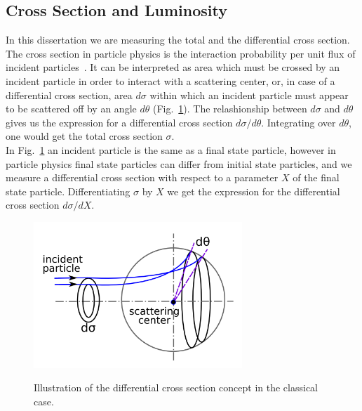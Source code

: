 \subsection{Cross Section and Luminosity}
\label{sec:LumiAndCS}

In this dissertation we are measuring the total and the differential cross section. The cross section in particle physics is the interaction probability per unit flux of incident particles~\cite{ref_fnal_LumiCS}. It can be interpreted as area which must be crossed by an incident particle in order to interact with a scattering center, or, in case of a differential cross section, area $d\sigma$ within which an incident particle must appear to be scattered off by an angle $d\theta$ (Fig.~\ref{fig:CSclassical}). The relashionship between $d\sigma$ and $d\theta$ gives us the expression for a differential cross section $d\sigma/d\theta$. Integrating over $d\theta$, one would get the total cross section $\sigma$. \\

In Fig.~\ref{fig:CSclassical} an incident particle is the same as a final state particle, however in particle physics final state particles can differ from initial state particles, and we measure a differential cross section with respect to a parameter $X$ of the final state particle. Differentiating $\sigma$ by $X$ we get the expression for the differential cross section $d\sigma/dX$.\\

\begin{figure}[htb]
  \begin{center}
    {\includegraphics[width=0.70\textwidth]{../figs/WgAbout/CSclassical.png}}
    \caption{Illustration of the differential cross section concept in the classical case.}
    \label{fig:CSclassical}
  \end{center}
\end{figure}

